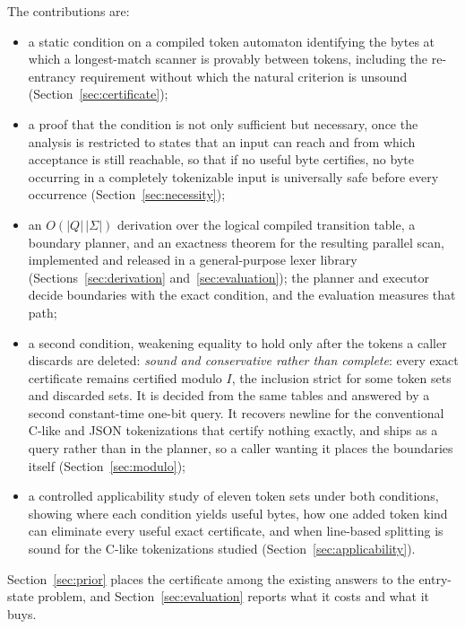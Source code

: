 \documentclass[11pt,a4paper]{article}
\theoremstyle{definition}
\theoremstyle{plain}
\begin{document}
\begin{samepage}
The contributions are:

\begin{itemize}
\item a static condition on a compiled token automaton identifying the bytes at which a longest-match scanner is
provably
between tokens, including the re-entrancy requirement without which the natural criterion is unsound
(Section~\ref{sec:certificate});
\item a proof that the condition is not only sufficient but necessary, once the analysis is restricted to states that an
input can reach and from which acceptance is still reachable, so that if no useful byte certifies, no byte occurring
in a completely tokenizable input is universally safe before every occurrence (Section~\ref{sec:necessity});
\item an $O(|Q|\,|\Sigma|)$ derivation over the logical compiled transition table, a boundary planner, and an exactness
theorem for the resulting parallel scan, implemented and released in a general-purpose lexer library
(Sections~\ref{sec:derivation} and~\ref{sec:evaluation}); the planner and executor decide boundaries with the exact
condition, and the evaluation measures that path;
\item a second condition, weakening equality to hold only after the tokens a caller discards are deleted: \emph{sound
and
conservative rather than complete}: every exact certificate remains certified modulo $I$, the inclusion strict for
some token sets and discarded sets. It is decided from the same tables and answered by a second constant-time one-bit
query. It recovers newline for the conventional C-like and JSON tokenizations that certify nothing exactly, and ships
as a query rather than in the planner, so a caller wanting it places the boundaries itself (Section~\ref{sec:modulo});
\item a controlled applicability study of eleven token sets under both conditions, showing where each condition yields
useful bytes, how one added token kind can eliminate every useful exact certificate, and when line-based splitting is
sound for the C-like tokenizations studied (Section~\ref{sec:applicability}).
\end{itemize}
\end{samepage}

Section~\ref{sec:prior} places the certificate among the existing answers to the entry-state problem, and
Section~\ref{sec:evaluation} reports what it costs and what it buys.
\end{document}
